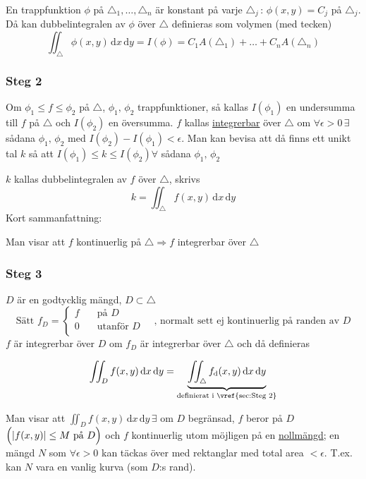 \documentclass[a4paper]{article}
\DeclarePairedDelimiter \abs{\lvert}{\rvert}
\begin{document}
En trappfunktion $\phi$ på $\triangle_1,\ldots,\triangle_n$ är konstant på varje $\triangle_j \,:\, \phi(x,y) = C_j$ på $\triangle_j$. Då kan dubbelintegralen av $\phi$ över $\triangle$ definieras som volymen (med tecken)
$$
	\iint_\triangle \phi(x,y) \,\mathrm{d}x\,\mathrm{d}y = I(\phi) = C_1A(\triangle_1) + \ldots + C_nA(\triangle_n)
$$

\newpage
\subsubsection{Steg 2} \label{sec:Steg 2}
Om $\phi_1 \leq f \leq \phi_2$ på $\triangle$, $\phi_1, \, \phi_2$ trappfunktioner, så kallas $I(\phi_1)$ en undersumma till $f$ på $\triangle$ och $I(\phi_2)$ en översumma.
$f$ kallas \underline{integrerbar} över $\triangle$ om $\forall \epsilon > 0 \, \exists$ sådana $\phi_1, \, \phi_2$ med $I(\phi_2) - I(\phi_1) < \epsilon$.
Man kan bevisa att då finns ett unikt tal $k$ så att $I(\phi_1) \leq k \leq I(\phi_2) \forall$ sådana $\phi_1, \, \phi_2$ \newline

$k$ kallas dubbelintegralen av $f$ över $\triangle$, skrivs
$$
	k = \iint_\triangle f(x,y) \,\mathrm{d}x\,\mathrm{d}y
$$
Kort sammanfattning:
\begin{framed}
	Man visar att $f$ kontinuerlig på $\triangle \Rightarrow f$ integrerbar över $\triangle$
\end{framed}

\subsubsection{Steg 3}
$D$ är en godtycklig mängd, $D \subset \triangle$ \newline
$$
	\text{Sätt } f_D =
	\begin{cases}
		f & \quad \text{på } D \\
		0 & \quad \text{utanför } D \\
  	\end{cases}
  	\quad \text{, normalt sett ej kontinuerlig på randen av } D
$$
$f$ är integrerbar över $D$ om $f_D$ är integrerbar över $\triangle$ och då definieras

$$
	\iint_D f(x,y) \,\mathrm{d}x\,\mathrm{d}y = \underbrace{\iint_\triangle f_\mathrm{d}(x,y) \,\mathrm{d}x\,\mathrm{d}y}_{\text{definierat i \vref{sec:Steg 2}}}
$$

Man visar att $\iint_D f(x,y) \,\mathrm{d}x\,\mathrm{d}y \, \exists$ om $D$ begränsad, $f$ beror på $D$ $\Big( \abs{f(x,y)} \leq M \text{ på } D \Big)$ och $f$ kontinuerlig utom möjligen på en \underline{nollmängd};
en mängd $N$ som $\forall \epsilon > 0$ kan täckas över med rektanglar med total area $< \epsilon$. T.ex. kan $N$ vara en vanlig kurva (som $D$:s rand). \newline
\end{document}
